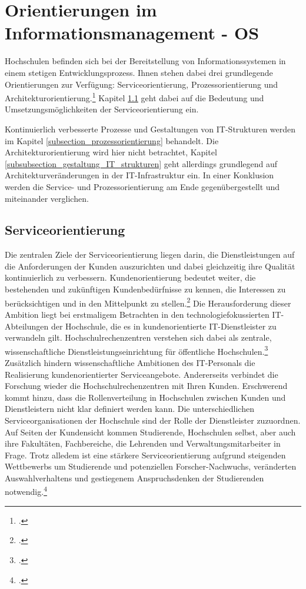 \section{Orientierungen im Informationsmanagement - OS}

Hochschulen befinden sich bei der Bereitstellung von Informationssystemen in einem stetigen Entwicklungsprozess. Ihnen stehen dabei drei grundlegende Orientierungen zur Verfügung: Serviceorientierung, Prozessorientierung und Architekturorientierung.\footcite[Vgl.][32]{leitner_itil_2008} Kapitel \ref{subsection_serviceorientierung} geht dabei auf die Bedeutung und Umsetzungsmöglichkeiten der Serviceorientierung ein. 

Kontinuierlich verbesserte Prozesse und Gestaltungen von IT-Strukturen werden im Kapitel \ref{subsection_prozessorientierung} behandelt. Die Architekturorientierung wird hier nicht betrachtet, Kapitel \ref{subsubsection_gestaltung_IT_strukturen} geht allerdings grundlegend auf Architekturveränderungen in der IT-Infrastruktur ein. In einer Konklusion werden die Service- und Prozessorientierung am Ende gegenübergestellt und miteinander verglichen.


\subsection{Serviceorientierung}
\label{subsection_serviceorientierung}
Die zentralen Ziele der Serviceorientierung liegen darin, die Dienstleistungen auf die 
Anforderungen der Kunden auszurichten und dabei gleichzeitig ihre Qualität kontinuierlich 
zu verbessern. Kundenorientierung bedeutet weiter, die bestehenden und zukünftigen 
Kundenbedürfnisse zu kennen, die Interessen zu berücksichtigen und in den Mittelpunkt zu 
stellen.\footcite[Vgl.][34]{leitner_itil_2008} Die Herausforderung dieser Ambition liegt bei 
erstmaligem Betrachten in den technologiefokussierten IT-Abteilungen der Hochschule, die 
es in kundenorientierte IT-Dienstleister zu verwandeln gilt. Hochschulrechenzentren 
verstehen sich dabei als zentrale, wissenschaftliche Dienstleistungseinrichtung für 
öffentliche Hochschulen.\footcite[Vgl.][10]{schroeder_2011} Zusätzlich hindern 
wissenschaftliche Ambitionen des IT-Personals die Realisierung kundenorientierter 
Serviceangebote. Andererseits verbindet die Forschung wieder die Hochschulrechenzentren 
mit Ihren Kunden. Erschwerend kommt hinzu, dass die Rollenverteilung in Hochschulen 
zwischen Kunden und Dienstleistern nicht klar definiert werden kann. Die unterschiedlichen 
Serviceorganisationen der Hochschule sind der Rolle der Dienstleister zuzuordnen. Auf 
Seiten der Kundensicht kommen Studierende, Hochschulen selbst, aber auch ihre Fakultäten, 
Fachbereiche, die Lehrenden und Verwaltungsmitarbeiter in Frage. Trotz alledem ist eine 
stärkere Serviceorientierung aufgrund steigenden Wettbewerbs um Studierende und 
potenziellen Forscher-Nachwuchs, veränderten Auswahlverhaltens und gestiegenem 
Anspruchsdenken der Studierenden notwendig.\footcite[Vgl.][14]{leitner_itil_2008}

